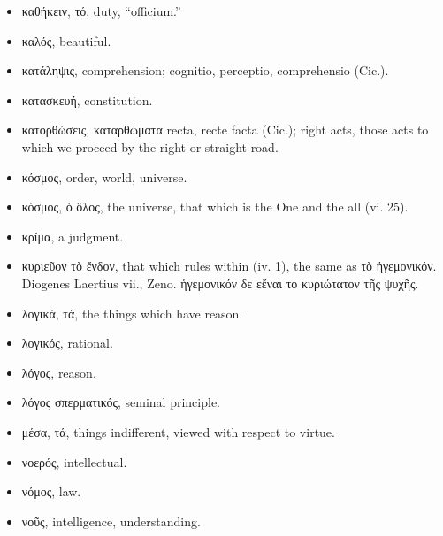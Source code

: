 \begin{itemize}[leftmargin=*]
\setlength\itemsep{0em}
\item
  \textgreek{καθήκειν, τό}, duty, ``officium.''
\item
  \textgreek{καλός}, beautiful.
\item
  \textgreek{κατάληψις}, comprehension; cognitio, perceptio, comprehensio (Cic.).
\item
  \textgreek{κατασκευή}, constitution.
\item
  \textgreek{κατορθώσεις, καταρθώματα} recta, recte facta (Cic.); right acts, those
  acts to which we proceed by the right or straight road.
\item
  \textgreek{κόσμος}, order, world, universe.
\item
  \textgreek{κόσμος, ὁ ὃλος}, the universe, that which is the One and the all (vi.
  25).
\item
  \textgreek{κρίμα}, a judgment.
\item
  \textgreek{κυριεῦον τὸ ἔνδον}, that which rules within (iv. 1), the same as \textgreek{τὸ
  ἡγεμονικόν}. Diogenes Laertius vii., Zeno. \textgreek{ἡγεμονικόν δε εἔναι το
  κυριώτατον τῆς ψυχῆς}.
\end{itemize}

\begin{itemize}[leftmargin=*]
\setlength\itemsep{0em}
\item
  \textgreek{λογικά, τά}, the things which have reason.
\item
  \textgreek{λογικός}, rational.
\item
  \textgreek{λόγος}, reason.
\item
  \textgreek{λόγος σπερματικός}, seminal principle.
\end{itemize}

\begin{itemize}[leftmargin=*]
\setlength\itemsep{0em}
\item
  \textgreek{μέσα, τά}, things indifferent, viewed with respect to virtue.
\end{itemize}

\begin{itemize}[leftmargin=*]
\setlength\itemsep{0em}
\item
  \textgreek{νοερός}, intellectual.
\item
  \textgreek{νόμος}, law.
\item
  \textgreek{νοῦς}, intelligence, understanding.
\end{itemize}

